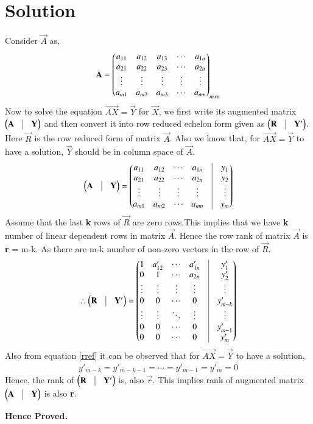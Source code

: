 \documentclass[journal,12pt,twocolumn]{IEEEtran}
\begin{document}
\section{Solution}
Consider $\vec{A}$ as,
\begin{align}
\mathbf{A} = \begin{pmatrix}a_{11}&a_{12}&a_{13}&\cdots&a_{1n}\\a_{21}&a_{22}&a_{23}&\cdots&a_{2n}\\\vdots&\vdots&\vdots&\vdots&\vdots\\a_{m1}&a_{m2}&a_{m3}&\cdots&a_{mn}\end{pmatrix}_{mxn}
\end{align} 
Now to solve the equation $\vec{AX}=\vec{Y}$ for $\vec{X}$, we first write its augmented matrix $\myvec{\vec{A}&\vrule&\vec{Y}}$ and then convert it into row reduced echelon form given as $\myvec{\vec{R}&\vrule&\vec{Y'}}$. Here $\vec{R}$ is the row reduced form of matrix $\vec{A}$. Also we know that, for $\vec{AX}=\vec{Y}$ to have a solution, $\vec{Y}$ should be in column space of $\vec{A}$.
\begin{align}
\myvec{\vec{A}&\vrule&\vec{Y}} = \myvec{a_{11}&a_{12}&\cdots&a_{1n}&\vrule&y_{1} \\a_{21}&a_{22}&\cdots&a_{2n}&\vrule&y_{2}\\\vdots&\vdots&\vdots&\vdots&\vrule&\vdots\\a_{m1}&a_{m2}&\cdots&a_{mn}&\vrule&y_{m}}
\end{align} 
Assume that the last \textbf{k} rows of $\vec{R}$ are zero rows.This implies that we have \textbf{k} number of linear dependent rows in matrix $\vec{A}$. Hence the row rank of matrix $\vec{A}$ is \textbf{r} = m-k. As there are m-k number of non-zero vectors in the row of $\vec{R}$.  
\begin{align}
\therefore \myvec{\vec{R}&\vrule&\vec{Y'}} = \myvec{1&a'_{12}&\cdots&a'_{1n}&\vrule&y'_{1} \\0&1&\cdots&a_{2n}&\vrule&y'_{2}\\\vdots&\vdots&\vdots&\vdots&\vrule&\vdots\\0&0&\cdots&0&\vrule&y'_{m-k}\\\vdots&\vdots&\ddots&\vdots&\vrule&\vdots\\0&0&\cdots&0&\vrule&y'_{m-1}\\0&0&\cdots&0&\vrule&y'_{m}}\label{rref}
\end{align}
Also from equation \eqref{rref} it can be observed that for   $\vec{AX}=\vec{Y}$ to have a solution,
\begin{align}
y'_{m-k} = y'_{m-k-1} = \cdots = y'_{m-1} = y'_{m} = 0 
\end{align} 
Hence, the rank of $\myvec{\vec{R}&\vrule&\vec{Y'}}$ is, also $\vec{r}$. This implies rank of augmented matrix $\myvec{\vec{A}&\vrule&\vec{Y}}$ is also \textbf{r}. \\
\centerline{\textbf{Hence Proved.}}
\end{document}
